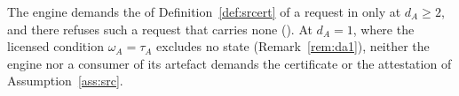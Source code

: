 
\begin{requirement}\label{req:licence-scope}
The engine demands the  of
Definition~\ref{def:srcert} of a request in  only at
$d_A\ge2$, and there refuses such a request that carries none
(). At $d_A=1$, where the licensed
condition $\omega_A=\tau_A$ excludes no state (Remark~\ref{rem:da1}),
neither the engine nor a consumer of its artefact demands the certificate or
the attestation of Assumption~\ref{ass:src}.
\end{requirement}
